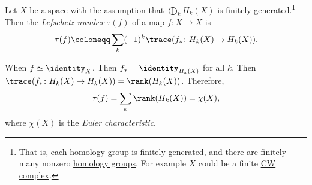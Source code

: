 \begin{definition}\label{def:Lefschetz-number}
	Let \(X\) be a space with the assumption that \(\bigoplus_k H_k(X)\) is finitely generated.\footnote{That is, each \hyperref[def:homology-group]{homology group}
		is finitely	generated, and there are finitely many nonzero \hyperref[def:homology-group]{homology groups}.
		For example \(X\) could be a finite \hyperref[def:CW-Complex]{CW complex}.}
	Then the \emph{Lefschetz number} \(\tau(f)\) of a map \(f \colon X \to X\) is
	\[
		\tau(f) \coloneqq \sum_k (-1)^k \trace(f_\ast \colon H_k(X) \to H_k(X)).
	\]
\end{definition}

\begin{eg}
	When \(f \simeq \identity _X\). Then \(f_\ast = \identity_{H_k(X)}\) for all \(k\). Then \(\trace(f_\ast \colon H_k(X) \to H_k(X)) = \rank(H_k(X))\).
	Therefore,
	\[
		\tau(f) = \sum_k \rank(H_k(X)) = \chi(X),
	\]
	where \(\chi(X)\) is the \emph{Euler characteristic}.
\end{eg}

